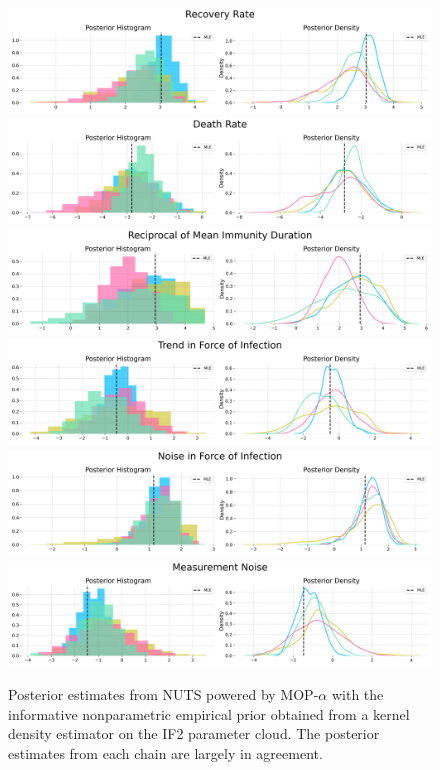 \begin{figure}[H]
    \centering\
    \includegraphics[scale=0.30]{imgs/pmcmc/nuts_eb/Recovery_Rate.png}
    \includegraphics[scale=0.30]{imgs/pmcmc/nuts_eb/Death_Rate.png}
    \includegraphics[scale=0.30]{imgs/pmcmc/nuts_eb/Reciprocal_of_Mean_Immunity_Duration.png}
    \includegraphics[scale=0.30]{imgs/pmcmc/nuts_eb/Trend_in_Force_of_Infection.png}
    \includegraphics[scale=0.30]{imgs/pmcmc/nuts_eb/Noise_in_Force_of_Infection.png}
    \includegraphics[scale=0.30]{imgs/pmcmc/nuts_eb/Measurement_Noise.png}
    \caption{Posterior estimates from NUTS powered by MOP-$\alpha$ with the informative nonparametric empirical prior obtained from a kernel density estimator on the IF2 parameter cloud. The posterior estimates from each chain are largely in agreement.}
    \label{fig:posteriors}
\end{figure}

\FloatBarrier
\newpage